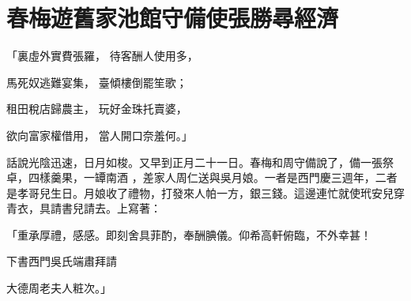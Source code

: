 %

\chapter{春梅遊舊家池館\KG 守備使張勝尋經濟}


\begin{showcontents}{}




「裏虛外實費張羅，  待客酬人使用多，

馬死奴逃難宴集，  臺傾樓倒罷笙歌；

租田稅店歸農主，  玩好金珠托賣婆，

欲向富家權借用，  當人開口奈羞何。」

話說光陰迅速，日月如梭。又早到正月二十一日。春梅和周守備說了，備一張祭卓，四樣羹果，一罈南酒 ，差家人周仁送與吳月娘。一者是西門慶三週年，二者是孝哥兒生日。月娘收了禮物，打發來人帕一方，銀三錢。這邊連忙就使玳安兒穿青衣，具請書兒請去。上寫著：

「重承厚禮，感感。即刻舍具菲酌，奉酬腆儀。仰希高軒俯臨，不外幸甚！

下書西門吳氏端肅拜請

大德周老夫人粧次。」


\end{showcontents}
